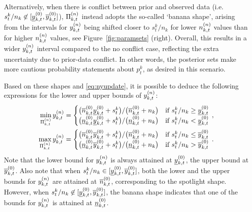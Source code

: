 \documentclass[12pt, a4paper]{elsarticle}
\begin{document}
Alternatively, when there is conflict between prior and observed data (i.e.\ $s^k_t/n_k \not\in [\underline{y}^{(0)}_{k,t}, \overline{y}^{(0)}_{k,t}]$),
$\Pi^{(n)}_{k,t}$ instead adopts the so-called `banana shape',
arising from the intervals for $y^{(n)}_{k,t}$  being shifted closer to $s^k_t/n_k$
for lower $n^{(n)}_{k,t}$ values than for higher $n^{(n)}_{k,t}$ values, see Figure~\ref{fig:paramsets} (right).
Overall, this results in a wider $y^{(n)}_{k,t}$ interval compared to the no conflict case, 
reflecting the extra uncertainty due to prior-data conflict.  
In other words, the posterior sets make more cautious probability statements about $p_t^k$, as desired in this scenario.

Based on these shapes and \eqref{eq:nyupdate}, it is possible to deduce the following expressions
for the lower and upper bounds of $y^{(n)}_{k,t}$:
\begin{align}
\begin{aligned}
\min_{\Pi^{(n)}_{k,t}} y^{(n)}_{k,t} &=
 \begin{cases}
 \big(\overline{n}^{(0)}_{k,t} \underline{y}^{(0)}_{k,t} + s^k_t\big) / \big(\overline{n}^{(0)}_{k,t} + n_k\big) & \text{if } s^k_t/n_k \ge \underline{y}^{(0)}_{k,t} \\
 \big(\underline{n}^{(0)}_{k,t} \underline{y}^{(0)}_{k,t} + s^k_t\big) / \big(\underline{n}^{(0)}_{k,t} + n_k\big) & \text{if } s^k_t/n_k <   \underline{y}^{(0)}_{k,t}
 \end{cases}\,,\\
\max_{\Pi^{(n)}_{k,t}} y^{(n)}_{k,t} &=
 \begin{cases}
 \big(\overline{n}^{(0)}_{k,t} \overline{y}^{(0)}_{k,t} + s^k_t\big) / \big(\overline{n}^{(0)}_{k,t} + n_k\big) & \text{if } s^k_t/n_k \le \overline{y}^{(0)}_{k,t} \\
 \big(\underline{n}^{(0)}_{k,t} \overline{y}^{(0)}_{k,t} + s^k_t\big) / \big(\underline{n}^{(0)}_{k,t} + n_k\big) & \text{if } s^k_t/n_k >   \overline{y}^{(0)}_{k,t}
 \end{cases}\,.
\end{aligned}
\label{eq:ysetupdate}
\end{align}
Note that the lower bound for $y^{(n)}_{k,t}$ is always attained at $\underline{y}^{(0)}_{k,t}$, the upper bound at $\overline{y}^{(0)}_{k,t}$.
Also note that when $s^k_t/n_k \in [\underline{y}^{(0)}_{k,t}, \overline{y}^{(0)}_{k,t}]$,
both the lower and the upper bounds for $y^{(n)}_{k,t}$ are attained at $\overline{n}^{(0)}_{k,t}$,
corresponding to the spotlight shape.
However, when $s^k_t/n_k \not\in [\underline{y}^{(0)}_{k,t}, \overline{y}^{(0)}_{k,t}]$,
the banana shape indicates that
one of the bounds for $y^{(n)}_{k,t}$ is attained at $\underline{n}^{(0)}_{k,t}$.
\end{document}
